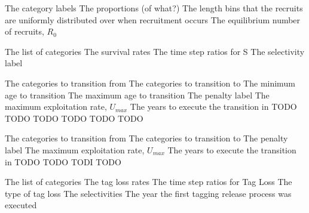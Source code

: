 \par\textbf{}\par
{} {The category labels}
 {The proportions (of what?)}
 {The length bins that the recruits are uniformly distributed over when recruitment occurs}
 {The equilibrium number of recruits, $R_0$}

\par\textbf{}\par
{} {The list of categories}
 {The survival rates}
 {The time step ratios for S}
 {The selectivity label}

\par\textbf{}\par
{} {The categories to transition from}
 {The categories to transition to}
 {The minimum age to transition}
 {The maximum age to transition}
 {The penalty label}
 {The maximum exploitation rate, $U_{max}$}
 {The years to execute the transition in}
 {TODO}
 {TODO}
 {TODO}
 {TODO}
 {TODO}
 {TODO}

\par\textbf{}\par
{} {The categories to transition from}
 {The categories to transition to}
 {The penalty label}
 {The maximum exploitation rate, $U_{max}$}
 {The years to execute the transition in}
 {TODO}
 {TODO}
 {TODI}
 {TODO}

\par\textbf{}\par
{} {The list of categories}
 {The tag loss rates}
 {The time step ratios for Tag Loss}
 {The type of tag loss}
 {The selectivities}
 {The year the first tagging release process was executed}

